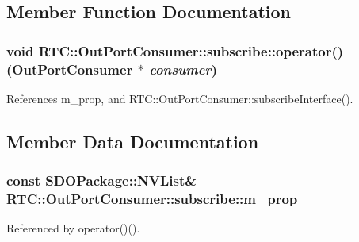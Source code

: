 \subsection{Member Function Documentation}
\subsubsection[{operator()}]{\setlength{\rightskip}{0pt plus 5cm}void RTC::OutPortConsumer::subscribe::operator() ({\bf OutPortConsumer} $\ast$ {\em consumer})\hspace{0.3cm}{\ttfamily  [inline]}}\label{structRTC_1_1OutPortConsumer_1_1subscribe_a28e112bf1d72f93ced02bf2df2384f1f}


References m\_\-prop, and RTC::OutPortConsumer::subscribeInterface().



\subsection{Member Data Documentation}
\subsubsection[{m\_\-prop}]{\setlength{\rightskip}{0pt plus 5cm}const SDOPackage::NVList\& {\bf RTC::OutPortConsumer::subscribe::m\_\-prop}}\label{structRTC_1_1OutPortConsumer_1_1subscribe_ac9867bea2bfd51b305b2c4770f4acf19}


Referenced by operator()().

